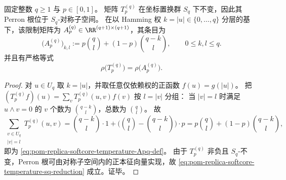 \begin{proposition}\label{prop:pom-replica-softcore-temperature-sq-reduction}
固定整数 \(q\ge 1\) 与 \(p\in[0,1]\)。
矩阵 \(T_p^{(q)}\) 在坐标置换群 \(S_q\) 下不变，因此其 Perron 根位于 \(S_q\)-对称子空间。
在以 Hamming 权 \(k=|u|\in\{0,\dots,q\}\) 分层的基下，该限制矩阵为 \(A_p^{(q)}\in\RR^{(q+1)\times(q+1)}\)，其条目为
\begin{equation}\label{eq:pom-replica-softcore-temperature-Apq-def}
\boxed{\;
\bigl(A_p^{(q)}\bigr)_{k,l}
:=p\binom{q}{l}+(1-p)\binom{q-k}{l},
\qquad 0\le k,l\le q.\;}
\end{equation}
并且有严格等式
\begin{equation}\label{eq:pom-replica-softcore-temperature-sq-reduction}
\boxed{\;
\rho\!\bigl(T_p^{(q)}\bigr)=\rho\!\bigl(A_p^{(q)}\bigr).\;}
\end{equation}
\end{proposition}
\begin{proof}
对 \(u\in U_q\) 取 \(k=|u|\)，并取任意仅依赖权的正函数 \(f(u)=g(|u|)\)。
把 \((T_p^{(q)}f)(u)=\sum_{v}T_p^{(q)}(u,v)f(v)\) 按 \(l=|v|\) 分组：
当 \(|v|=l\) 时满足 \(u\wedge v=0\) 的 \(v\) 个数为 \(\binom{q-k}{l}\)，总数为 \(\binom{q}{l}\)。
故
\[
\sum_{\substack{v\in U_q\\ |v|=l}}T_p^{(q)}(u,v)
=\binom{q-k}{l}\cdot 1+\bigl(\binom{q}{l}-\binom{q-k}{l}\bigr)\cdot p
=p\binom{q}{l}+(1-p)\binom{q-k}{l},
\]
即为 \eqref{eq:pom-replica-softcore-temperature-Apq-def}。
由于 \(T_p^{(q)}\) 非负且 \(S_q\)-不变，Perron 根可由对称子空间内的正本征向量实现，故 \eqref{eq:pom-replica-softcore-temperature-sq-reduction} 成立。证毕。
\end{proof}

